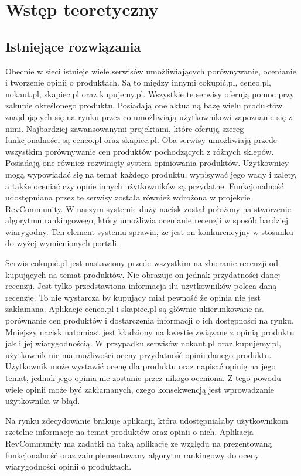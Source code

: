 \chapter{Wstęp teoretyczny}

\section{Istniejące rozwiązania}
Obecnie w sieci istnieje wiele serwisów umożliwiających porównywanie, ocenianie i tworzenie opinii o produktach. Są to między innymi cokupić.pl,  ceneo.pl, nokaut.pl, skapiec.pl oraz kupujemy.pl. Wszystkie te serwisy oferują pomoc przy zakupie określonego produktu. Posiadają one aktualną bazę wielu produktów znajdujących się na rynku przez co umożliwiają użytkownikowi zapoznanie się z nimi. Najbardziej zawansowanymi projektami, które oferują szereg funkcjonalności są ceneo.pl oraz skapiec.pl. Oba serwisy umożliwiają przede wszystkim porównywanie cen produktów pochodzących z różnych sklepów. Posiadają one  również rozwinięty system opiniowania produktów. Użytkownicy mogą wypowiadać się na temat każdego produktu, wypisywać jego wady i zalety, a także oceniać czy opnie innych użytkowników są przydatne. Funkcjonalność udostępniana przez te serwisy została również wdrożona w projekcie RevCommunity. W naszym systemie duży nacisk został położony na stworzenie algorytmu rankingowego, który umożliwia ocenianie recenzji w sposób bardziej wiarygodny. Ten element systemu sprawia, że jest on konkurencyjny w stosunku do wyżej wymienionych portali. 

Serwis cokupić.pl jest nastawiony przede wszystkim na zbieranie recenzji od kupujących na temat produktów. Nie obrazuje on jednak przydatności danej recenzji. Jest tylko przedstawiona informacja ilu użytkowników poleca daną recenzję. To nie wystarcza by kupujący miał pewność że opinia nie jest zakłamana. Aplikacje ceneo.pl i skapiec.pl są głównie ukierunkowane na porównanie cen produktów i dostarczenia informacji o ich dostępności na rynku. Mniejszy nacisk natomiast jest kładziony na kwestie związane z opinią produktu jak i jej wiarygodnością.  W przypadku serwisów nokaut.pl oraz kupujemy.pl, użytkownik nie ma możliwości oceny przydatność opinii danego produktu. Użytkownik może wystawić ocenę dla produktu oraz napisać opinię na jego temat, jednak jego opinia nie zostanie przez nikogo oceniona. Z tego powodu wiele opinii może być zakłamanych, czego konsekwencją jest wprowadzanie użytkownika w błąd. 

Na rynku zdecydowanie brakuje aplikacji, która udostępniałaby użytkownikom rzetelne informacje na temat produktów oraz opinii o nich. Aplikacja RevCommunity ma zadatki na taką aplikację ze względu na prezentowaną funkcjonalność oraz zaimplementowany algorytm rankingowy do oceny wiarygodności opinii o produktach. 



